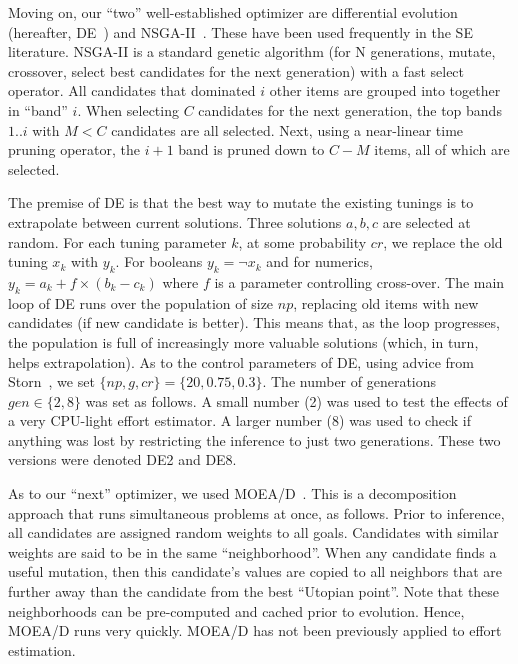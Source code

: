 Moving on, our ``two'' well-established optimizer are differential evolution (hereafter, DE~\cite{storn1997differential}) and NSGA-II~\cite{deb02}. These have been used frequently in the SE literature\cite{Fu2016TuningFS,AGRAWAL2018,agrawal2017better,sayyad2013value,sayyad2013pareto}.
 NSGA-II is a standard genetic algorithm  (for N generations, mutate, crossover, select best candidates  for the next generation) with a fast   select operator. 
All candidates that dominated $i$ other items are grouped into together in ``band'' $i$.
When selecting $C$ candidates for the next generation, the top bands $1..i$ with $M< C$ candidates
are all selected.  Next, using a  near-linear time pruning operator, the $i+1$ band is pruned down to $C-M$ items, all of which are selected.


 The premise of DE is that the best way to mutate the existing tunings is to extrapolate between current solutions. Three solutions $a, b, c$ are selected at random. For each tuning parameter $k$, at some probability $cr$, we replace the old tuning $x_k$ with $y_k$. For
 booleans $y_k = \neg x_k$ and for numerics, 
\mbox{$y_k = a_k + f \times (b_k - c_k)$}
where $f$ is a
 parameter controlling cross-over.  
The main loop of DE runs over the population of size $np$, replacing old items with new candidates (if new candidate is better). This means that, as the loop progresses, the population is full of increasingly more valuable solutions (which, in turn,
helps   extrapolation). 
As to the control parameters of DE,  using advice from Storn~\cite{storn1997differential}, we set $\{\mathit{np,g,cr}\}=\{20,0.75,0.3\}$.
The number of generations $\mathit{gen}\in\{2,8\}$ was set as follows. A   small number (2) was used to test
the effects of  a very   CPU-light    effort estimator. A  larger number (8) was used to check if anything was
lost by restricting the inference to just two generations. These two versions were denoted DE2 and DE8.

As to our ``next'' optimizer, we used MOEA/D~\cite{Zhang07}.
This is a decomposition approach that
runs simultaneous   problems at once, as follows.  Prior to inference,
all candidates are assigned random weights to all  goals. Candidates
with similar weights are said to be in the same ``neighborhood''. When any candidate
 finds a useful mutation, then this candidate's
 values are copied to all neighbors that are further away than the candidate from the  best ``Utopian point''. Note that  these neighborhoods can be pre-computed and cached
prior to evolution. Hence, MOEA/D runs very quickly.
 MOEA/D has not been previously applied to effort estimation.

